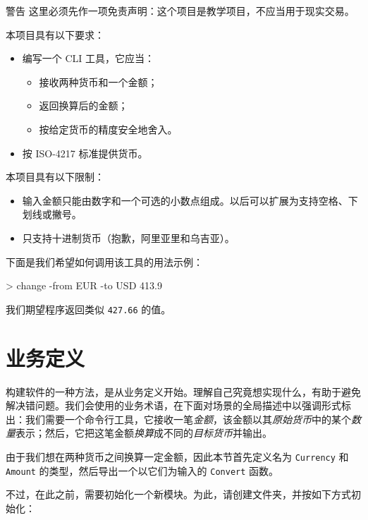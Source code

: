 \begin{warningbox}{警告}
这里必须先作一项免责声明：这个项目是教学项目，不应当用于现实交易。
\end{warningbox}

本项目具有以下要求：

\begin{itemize}
\item 编写一个 CLI 工具，它应当：
  \begin{itemize}
  \item 接收两种货币和一个金额；
  \item 返回换算后的金额；
  \item 按给定货币的精度安全地舍入。
  \end{itemize}
\item 按 ISO-4217 标准提供货币。
\end{itemize}

本项目具有以下限制：

\begin{itemize}
\item 输入金额只能由数字和一个可选的小数点组成。以后可以扩展为支持空格、下划线或撇号。
\item 只支持十进制货币（抱歉，阿里亚里和乌吉亚）。
\end{itemize}

下面是我们希望如何调用该工具的用法示例：

\begin{shellcode}[]
> change -from EUR -to USD 413.9
\end{shellcode}

我们期望程序返回类似 \texttt{427.66} 的值。

\section{业务定义}

构建软件的一种方法，是从业务定义开始。理解自己究竟想实现什么，有助于避免解决错问题。我们会使用的业务术语，在下面对场景的全局描述中以强调形式标出：我们需要一个命令行工具，它接收一笔\emph{金额}，该金额以其\emph{原始货币}中的某个\emph{数量}表示；然后，它把这笔金额\emph{换算}成不同的\emph{目标货币}并输出。

由于我们想在两种货币之间换算一定金额，因此本节首先定义名为 \texttt{Currency} 和 \texttt{Amount} 的类型，然后导出一个以它们为输入的 \texttt{Convert} 函数。

不过，在此之前，需要初始化一个新模块。为此，请创建文件夹，并按如下方式初始化：

